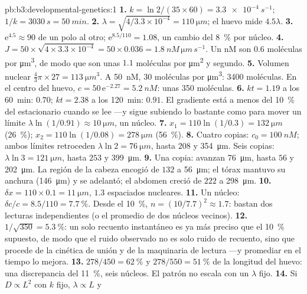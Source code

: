 \begin{solution}{pb:b3:developmental-genetics:1}
\textbf{1.} $k = \ln 2/(35\times 60) = \qty{3.3e-4}{s^{-1}}$; $1/k =
\qty{3030}{s} = \qty{50}{min}$.
\textbf{2.} $\lambda = \sqrt{4/3.3\times 10^{-4}} = \qty{110}{\micro m}$;
el huevo mide $4.5\lambda$.
\textbf{3.} $\mathrm{e}^{4.5} \approx 90$ de un polo al otro;
$\mathrm{e}^{8.5/110} = 1.08$, un cambio del \qty{8}{\%} por núcleo.
\textbf{4.} $J = 50\times\sqrt{4\times 3.3\times 10^{-4}} = 50\times
0.036 = \qty{1.8}{nM\,\micro m\,s^{-1}}$. Un nM son $0.6$ moléculas
por \unit{\micro m^3}, de modo que son unas $1.1$ moléculas por
\unit{\micro m^2} y segundo.
\textbf{5.} Volumen nuclear $\tfrac{4}{3}\pi\times 27 = \qty{113}{\micro
m^3}$. A \qty{50}{nM}, $30$ moléculas por \unit{\micro m^3}:
\num{3400} moléculas. En el centro del huevo, $c = 50\,\mathrm{e}^{-2.27} =
\qty{5.2}{nM}$: unas \num{350} moléculas.
\textbf{6.} $kt = 1.19$ a los \qty{60}{min}: $0.70$; $kt = 2.38$ a los
\qty{120}{min}: $0.91$. El gradiente está a menos del \qty{10}{\%} del
estacionario cuando se lee ---y sigue subiendo lo bastante como para
mover un límite $\lambda\ln(1/0.91) \approx \qty{10}{\micro m}$, un
núcleo.
\textbf{7.} $x_{1} = 110\ln(1/0.3) = \qty{132}{\micro m}$
(\qty{26}{\%}); $x_{2} = 110\ln(1/0.08) = \qty{278}{\micro m}$
(\qty{56}{\%}).
\textbf{8.} Cuatro copias: $c_{0} = \qty{100}{nM}$; ambos límites
retroceden $\lambda\ln 2 = \qty{76}{\micro m}$, hasta $208$ y
\qty{354}{\micro m}. Seis copias: $\lambda\ln 3 = \qty{121}{\micro m}$,
hasta $253$ y \qty{399}{\micro m}.
\textbf{9.} Una copia: avanzan \qty{76}{\micro m}, hasta $56$ y
\qty{202}{\micro m}. La región de la cabeza encogió de $132$ a
\qty{56}{\micro m}; el tórax mantuvo su anchura (\qty{146}{\micro m}) y
se adelantó; el abdomen creció de $222$ a \qty{298}{\micro m}.
\textbf{10.} $\delta x = 110\times 0.1 = \qty{11}{\micro m}$, $1.3$
espaciados nucleares.
\textbf{11.} Un núcleo: $\delta c/c = 8.5/110 = \qty{7.7}{\%}$. Desde el
\qty{10}{\%}, $n = (10/7.7)^{2} \approx 1.7$: bastan dos lecturas
independientes (o el promedio de dos núcleos vecinos).
\textbf{12.} $1/\sqrt{350} = \qty{5.3}{\%}$: un solo recuento
instantáneo es ya más preciso que el \qty{10}{\%} supuesto, de modo que
el ruido observado no es solo ruido de recuento, sino que procede de la
cinética de unión y de la maquinaria de lectura ---y promediar en el
tiempo lo mejora.
\textbf{13.} $278/450 = \qty{62}{\%}$ y $278/550 = \qty{51}{\%}$ de la
longitud del huevo: una discrepancia del \qty{11}{\%}, seis núcleos. El
patrón no escala con un $\lambda$ fijo.
\textbf{14.} Si $D \propto L^{2}$ con $k$ fijo, $\lambda \propto L$ y

\end{solution}
